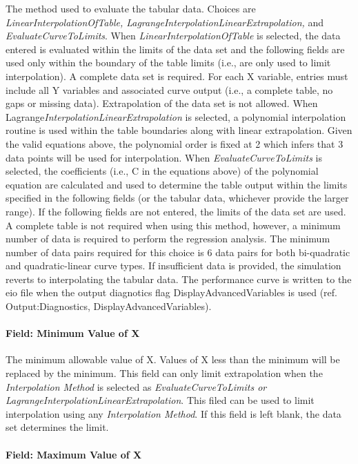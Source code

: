 The method used to evaluate the tabular data. Choices are \emph{LinearInterpolationOfTable, LagrangeInterpolationLinearExtrapolation,} and \emph{EvaluateCurveToLimits}. When \emph{LinearInterpolationOfTable} is selected, the data entered is evaluated within the limits of the data set and the following fields are used only within the boundary of the table limits (i.e., are only used to limit interpolation). A complete data set is required. For each X variable, entries must include all Y variables and associated curve output (i.e., a complete table, no gaps or missing data). Extrapolation of the data set is not allowed. When Lagrange\emph{InterpolationLinearExtrapolation} is selected, a polynomial interpolation routine is used within the table boundaries along with linear extrapolation. Given the valid equations above, the polynomial order is fixed at 2 which infers that 3 data points will be used for interpolation. When \emph{EvaluateCurveToLimits} is selected, the coefficients (i.e., C in the equations above) of the polynomial equation are calculated and used to determine the table output within the limits specified in the following fields (or the tabular data, whichever provide the larger range). If the following fields are not entered, the limits of the data set are used. A complete table is not required when using this method, however, a minimum number of data is required to perform the regression analysis. The minimum number of data pairs required for this choice is 6 data pairs for both bi-quadratic and quadratic-linear curve types. If insufficient data is provided, the simulation reverts to interpolating the tabular data. The performance curve is written to the eio file when the output diagnotics flag DisplayAdvancedVariables is used (ref. Output:Diagnostics, DisplayAdvancedVariables).

\paragraph{Field: Minimum Value of X}\label{field-minimum-value-of-x-1-000}

The minimum allowable value of X. Values of X less than the minimum will be replaced by the minimum. This field can only limit extrapolation when the \emph{Interpolation Method} is selected as \emph{EvaluateCurveToLimits or LagrangeInterpolationLinearExtrapolation}. This filed can be used to limit interpolation using any \emph{Interpolation Method}. If this field is left blank, the data set determines the limit.

\paragraph{Field: Maximum Value of X}\label{field-maximum-value-of-x-1-000}


